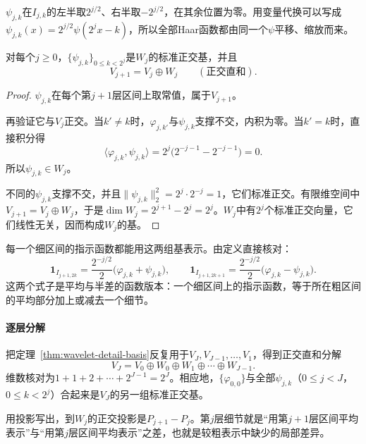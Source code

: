 $\psi_{j,k}$在$I_{j,k}$的左半取$2^{j/2}$、右半取$-2^{j/2}$，在其余位置为零。用变量代换可以写成$\psi_{j,k}(x)=2^{j/2}\psi(2^jx-k)$，所以全部Haar函数都由同一个$\psi$平移、缩放而来。

\begin{theorem}[细节空间的标准正交基]
\label{thm:wavelet-detail-basis}
对每个$j\geq0$，$\{\psi_{j,k}\}_{0\leq k<2^j}$是$W_j$的标准正交基，并且
\begin{equation}
 V_{j+1}=V_j\oplus W_j\qquad(\text{正交直和}).
 \label{eq:wavelet-one-step-decomposition}
\end{equation}
\end{theorem}

\begin{proof}
$\psi_{j,k}$在每个第$j+1$层区间上取常值，属于$V_{j+1}$。

再验证它与$V_j$正交。当$k'\neq k$时，$\varphi_{j,k'}$与$\psi_{j,k}$支撑不交，内积为零。当$k'=k$时，直接积分得
\[
 \langle\varphi_{j,k},\psi_{j,k}\rangle=2^{j}\bigl(2^{-j-1}-2^{-j-1}\bigr)=0.
\]
所以$\psi_{j,k}\in W_j$。

不同的$\psi_{j,k}$支撑不交，并且$\lVert\psi_{j,k}\rVert_2^2=2^j\cdot2^{-j}=1$，它们标准正交。有限维空间中$V_{j+1}=V_j\oplus W_j$，于是$\dim W_j=2^{j+1}-2^j=2^j$。$W_j$中有$2^j$个标准正交向量，它们线性无关，因而构成$W_j$的基。
\end{proof}

每一个细区间的指示函数都能用这两组基表示。由定义直接核对：
\[
 \mathbf{1}_{I_{j+1,2k}}=\frac{2^{-j/2}}{2}\bigl(\varphi_{j,k}+\psi_{j,k}\bigr),\qquad
 \mathbf{1}_{I_{j+1,2k+1}}=\frac{2^{-j/2}}{2}\bigl(\varphi_{j,k}-\psi_{j,k}\bigr).
\]
这两个式子是平均与半差的函数版本：一个细区间上的指示函数，等于所在粗区间的平均部分加上或减去一个细节。

\paragraph{逐层分解}
把定理~\ref{thm:wavelet-detail-basis}反复用于$V_J,V_{J-1},\ldots,V_1$，得到正交直和分解
\begin{equation}
 V_J=V_0\oplus W_0\oplus W_1\oplus\cdots\oplus W_{J-1}.
 \label{eq:wavelet-finite-decomposition}
\end{equation}
维数核对为$1+1+2+\cdots+2^{J-1}=2^J$。相应地，$\{\varphi_{0,0}\}$与全部$\psi_{j,k}$（$0\leq j<J$，$0\leq k<2^j$）合起来是$V_J$的另一组标准正交基。

用投影写出，到$W_j$的正交投影是$P_{j+1}-P_j$。第$j$层细节就是“用第$j+1$层区间平均表示”与“用第$j$层区间平均表示”之差，也就是较粗表示中缺少的局部差异。


